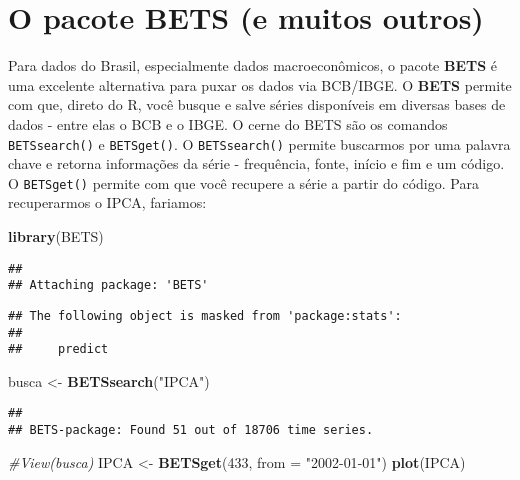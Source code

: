 \documentclass[
]{book}
\newenvironment{Shaded}{\begin{snugshade}}{\end{snugshade}}
\newcommand{\CommentTok}[1]{\textcolor[rgb]{0.56,0.35,0.01}{\textit{#1}}}
\newcommand{\DataTypeTok}[1]{\textcolor[rgb]{0.13,0.29,0.53}{#1}}
\newcommand{\DecValTok}[1]{\textcolor[rgb]{0.00,0.00,0.81}{#1}}
\newcommand{\KeywordTok}[1]{\textcolor[rgb]{0.13,0.29,0.53}{\textbf{#1}}}
\newcommand{\NormalTok}[1]{#1}
\newcommand{\StringTok}[1]{\textcolor[rgb]{0.31,0.60,0.02}{#1}}
\begin{document}
\hypertarget{o-pacote-bets-e-muitos-outros}{%
\section{O pacote BETS (e muitos outros)}\label{o-pacote-bets-e-muitos-outros}}

Para dados do Brasil, especialmente dados macroeconômicos, o pacote \textbf{BETS} é uma excelente alternativa para puxar os dados via BCB/IBGE. O \textbf{BETS} permite com que, direto do R, você busque e salve séries disponíveis em diversas bases de dados - entre elas o BCB e o IBGE. O cerne do BETS são os comandos \texttt{BETSsearch()} e \texttt{BETSget()}. O \texttt{BETSsearch()} permite buscarmos por uma palavra chave e retorna informações da série - frequência, fonte, início e fim e um código. O \texttt{BETSget()} permite com que você recupere a série a partir do código. Para recuperarmos o IPCA, fariamos:

\begin{Shaded}
\begin{Highlighting}[]
\KeywordTok{library}\NormalTok{(BETS)}
\end{Highlighting}
\end{Shaded}

\begin{verbatim}
## 
## Attaching package: 'BETS'
\end{verbatim}

\begin{verbatim}
## The following object is masked from 'package:stats':
## 
##     predict
\end{verbatim}

\begin{Shaded}
\begin{Highlighting}[]
\NormalTok{busca \textless{}{-}}\StringTok{ }\KeywordTok{BETSsearch}\NormalTok{(}\StringTok{"IPCA"}\NormalTok{)}
\end{Highlighting}
\end{Shaded}

\begin{verbatim}
## 
## BETS-package: Found 51 out of 18706 time series.
\end{verbatim}

\begin{Shaded}
\begin{Highlighting}[]
\CommentTok{\#View(busca)}
\NormalTok{IPCA \textless{}{-}}\StringTok{ }\KeywordTok{BETSget}\NormalTok{(}\DecValTok{433}\NormalTok{, }\DataTypeTok{from =} \StringTok{"2002{-}01{-}01"}\NormalTok{)}
\KeywordTok{plot}\NormalTok{(IPCA)}
\end{Highlighting}
\end{Shaded}
\end{document}
